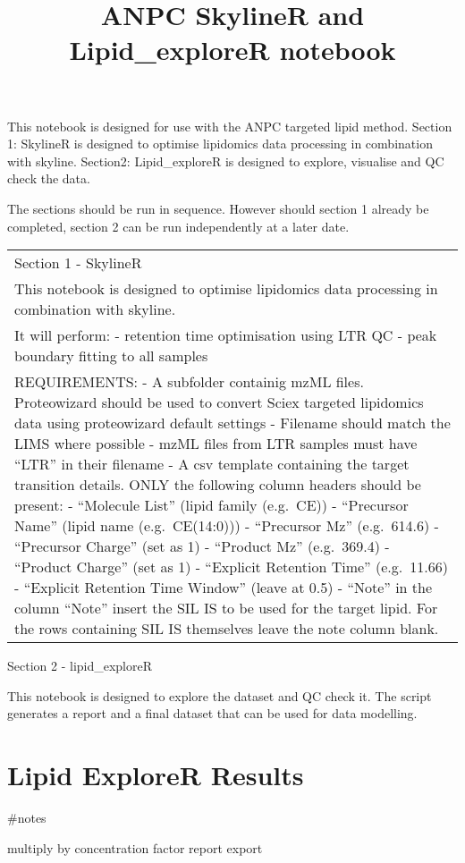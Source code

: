 \documentclass[
]{article}
\title{ANPC SkylineR and Lipid\_exploreR notebook}
\author{}
\date{\vspace{-2.5em}}
\begin{document}
\maketitle

This notebook is designed for use with the ANPC targeted lipid method.
Section 1: SkylineR is designed to optimise lipidomics data processing
in combination with skyline. Section2: Lipid\_exploreR is designed to
explore, visualise and QC check the data.

The sections should be run in sequence. However should section 1 already
be completed, section 2 can be run independently at a later date.

\begin{longtable}[]{@{}
  >{\raggedright\arraybackslash}p{}@{}}
\toprule
\endhead
Section 1 - SkylineR \\
This notebook is designed to optimise lipidomics data processing in
combination with skyline. \\
It will perform: - retention time optimisation using LTR QC - peak
boundary fitting to all samples \\
REQUIREMENTS: - A subfolder containig mzML files. Proteowizard should be
used to convert Sciex targeted lipidomics data using proteowizard
default settings - Filename should match the LIMS where possible - mzML
files from LTR samples must have ``LTR'' in their filename - A csv
template containing the target transition details. ONLY the following
column headers should be present: - ``Molecule List'' (lipid family
(e.g.~CE)) - ``Precursor Name'' (lipid name (e.g.~CE(14:0))) -
``Precursor Mz'' (e.g.~614.6) - ``Precursor Charge'' (set as 1) -
``Product Mz'' (e.g.~369.4) - ``Product Charge'' (set as 1) - ``Explicit
Retention Time'' (e.g.~11.66) - ``Explicit Retention Time Window''
(leave at 0.5) - ``Note'' in the column ``Note'' insert the SIL IS to be
used for the target lipid. For the rows containing SIL IS themselves
leave the note column blank. \\
\bottomrule
\end{longtable}

Section 2 - lipid\_exploreR

This notebook is designed to explore the dataset and QC check it. The
script generates a report and a final dataset that can be used for data
modelling.

\hypertarget{lipid-explorer-results}{%
\section{Lipid ExploreR Results}\label{lipid-explorer-results}}

\#notes

multiply by concentration factor report export
\end{document}
